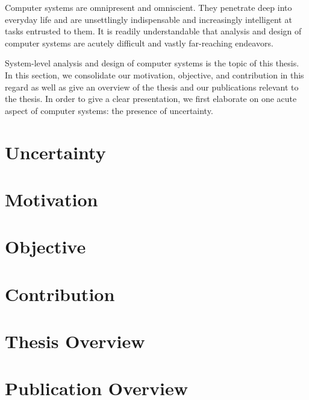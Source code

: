 Computer systems are omnipresent and omniscient. They penetrate deep into
everyday life and are unsettlingly indispensable and increasingly intelligent at
tasks entrusted to them. It is readily understandable that analysis and design
of computer systems are acutely difficult and vastly far-reaching endeavors.

System-level analysis and design of computer systems is the topic of this
thesis. In this section, we consolidate our motivation, objective, and
contribution in this regard as well as give an overview of the thesis and our
publications relevant to the thesis. In order to give a clear presentation, we
first elaborate on one acute aspect of computer systems: the presence of
uncertainty.

\section{Uncertainty}

\section{Motivation}

\section{Objective}

\section{Contribution}

\section{Thesis Overview}

\section{Publication Overview}
